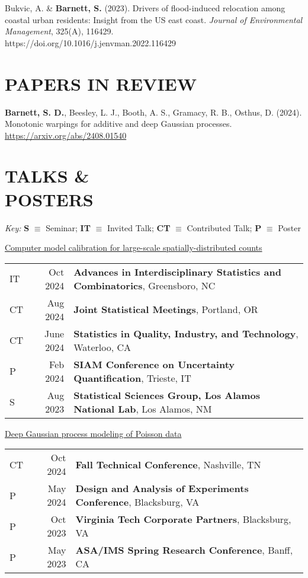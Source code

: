 \documentclass[margin,line]{res}
\begin{document}
\begin{resume}
Bukvic, A. \& \textbf{Barnett, S.} (2023). Drivers of flood-induced relocation among coastal urban residents: Insight from the US east coast. {\it Journal of Environmental Management}, 325(A), 116429.\\ https://doi.org/10.1016/j.jenvman.2022.116429

\section{\bf{PAPERS IN REVIEW}}

\textbf{Barnett, S. D.}, Beesley, L. J., Booth, A. S., Gramacy, R. B., Osthus, D. (2024). Monotonic warpings for additive and deep Gaussian processes. \href{https://arxiv.org/abs/2408.01540}{https://arxiv.org/abs/2408.01540}

\section{\bf TALKS \& \\POSTERS}
{\em Key:}
{\bf S} $\equiv$ Seminar;
{\bf IT} $\equiv$ Invited Talk;
{\bf CT} $\equiv$ Contributed Talk;
{\bf P} $\equiv$ Poster

\underline{Computer model calibration for large-scale spatially-distributed counts}\\
\begin{tabular}{lrl}
IT\quad\quad & Oct 2024 & {\bf Advances in Interdisciplinary Statistics and Combinatorics}, Greensboro, NC \\
CT\quad\quad & Aug 2024 & {\bf Joint Statistical Meetings}, Portland, OR \\
CT\quad\quad & June 2024 & {\bf Statistics in Quality, Industry, and Technology}, Waterloo, CA \\
P\quad\quad & Feb 2024 & {\bf SIAM Conference on Uncertainty Quantification}, Trieste, IT \\
S\quad\quad & Aug 2023 & {\bf Statistical Sciences Group, Los Alamos National Lab}, Los Alamos, NM \\
\end{tabular}

\underline{Deep Gaussian process modeling of Poisson data}\\
\begin{tabular}{lrl}
CT\quad\quad & Oct 2024 & {\bf Fall Technical Conference}, Nashville, TN \\
P\quad\quad & May 2024 & {\bf Design and Analysis of Experiments Conference}, Blacksburg, VA \\
P\quad\quad & Oct 2023 & {\bf Virginia Tech Corporate Partners}, Blacksburg, VA \\
P\quad\quad & May 2023 & {\bf ASA/IMS Spring Research Conference}, Banff, CA \\
\end{tabular}


\end{resume}
\end{document}
